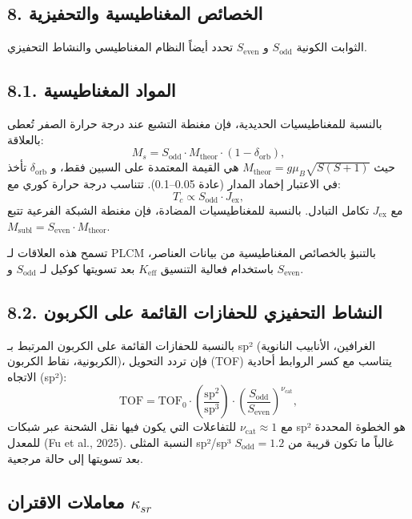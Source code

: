\documentclass[11pt,a4paper]{article}
\begin{document}
	\begin{otherlanguage}{arabic}
		
		\subsection*{8. الخصائص المغناطيسية والتحفيزية}
		
		الثوابت الكونية \(S_{\text{odd}}\) و \(S_{\text{even}}\) تحدد أيضاً النظام المغناطيسي والنشاط التحفيزي.
		
		\subsection*{8.1. المواد المغناطيسية}
		بالنسبة للمغناطيسيات الحديدية، فإن مغنطة التشبع عند درجة حرارة الصفر تُعطى بالعلاقة:
		\[
		M_s = S_{\text{odd}} \cdot M_{\text{theor}} \cdot (1 - \delta_{\text{orb}}),
		\]
		حيث \(M_{\text{theor}} = g \mu_B \sqrt{S(S+1)}\) هي القيمة المعتمدة على السبين فقط، و \(\delta_{\text{orb}}\) تأخذ في الاعتبار إخماد المدار (عادة 0.05–0.1). تتناسب درجة حرارة كوري مع:
		\[
		T_c \propto S_{\text{odd}} \cdot J_{\text{ex}},
		\]
		مع \(J_{\text{ex}}\) تكامل التبادل. بالنسبة للمغناطيسيات المضادة، فإن مغنطة الشبكة الفرعية تتبع \(M_{\text{subl}} = S_{\text{even}} \cdot M_{\text{theor}}\).
		
		تسمح هذه العلاقات لـ PLCM بالتنبؤ بالخصائص المغناطيسية من بيانات العناصر، باستخدام فعالية التنسيق \(K_{\text{eff}}\) بعد تسويتها كوكيل لـ \(S_{\text{odd}}\) و \(S_{\text{even}}\).
		
		\subsection*{8.2. النشاط التحفيزي للحفازات القائمة على الكربون}
		بالنسبة للحفازات القائمة على الكربون المرتبط بـ sp² (الغرافين، الأنابيب النانوية الكربونية، نقاط الكربون)، فإن تردد التحويل (TOF) يتناسب مع كسر الروابط أحادية الاتجاه (sp²):
		\[
		\text{TOF} = \text{TOF}_0 \cdot \left( \frac{\text{sp}^2}{\text{sp}^3} \right) \cdot \left( \frac{S_{\text{odd}}}{S_{\text{even}}} \right)^{\nu_{\text{cat}}},
		\]
		مع \(\nu_{\text{cat}} \approx 1\) للتفاعلات التي يكون فيها نقل الشحنة عبر شبكات sp² هو الخطوة المحددة للمعدل (Fu et al., 2025). النسبة المثلى sp²/sp³ غالباً ما تكون قريبة من \(S_{\text{odd}} = 1.2\) بعد تسويتها إلى حالة مرجعية.
		
		\subsection{معاملات الاقتران \(\kappa_{sr}\)}
		

\end{otherlanguage}
\end{document}
